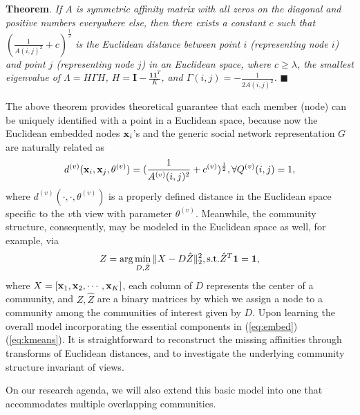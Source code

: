 \vspace{5pt}
\textbf{Theorem}. \textit{If $A$ is symmetric affinity matrix with all zeros on the diagonal and positive numbers everywhere else, then there exists a constant $c$ such that $(\frac{1}{A(i,j)^2}+c)^{\frac{1}{2}}$ is the Euclidean distance between point $i$ (representing node $i$) and point $j$ (representing node $j$) in an Euclidean space, where $c\geq\lambda$, the smallest eigenvalue of $\Lambda=H\Gamma H$, $H=\mathbf{I}-\frac{\mathbf{1}\mathbf{1}^T}{K}$, and $\Gamma(i,j)=-\frac{1}{2A(i,j)^2}$.} $\blacksquare$
\vspace{5pt}


The above theorem provides theoretical guarantee that each member (node) can be uniquely identified with a point in a Euclidean space, because now the Euclidean embedded nodes ${\bf x}_i$'s and the generic social network representation $G$ are naturally related as
\begin{equation}\label{eq:embed}
d^{(v)}({\bf x}_i, {\bf x}_j, \theta^{(v)})=(\frac{1}{A^{(v)}(i,j)^2}+c^{(v)})^{\frac{1}{2}}, \forall Q^{(v)}(i,j)=1,
\end{equation}
where $d^{(v)}(\cdot, \cdot, \theta^{(v)})$ is a properly defined distance in the Euclidean space specific to the $v$th view with parameter $\theta^{(v)}$. Meanwhile, the community structure, consequently, may be modeled in the Euclidean space as well, for example, via
\begin{equation}\label{eq:kmeans}
Z=\arg\min_{D,\hat{Z}}\|X-D\hat{Z}\|^{2}_{2}, \textup{s.t.} \hat{Z}^{T}\mathbf{1}=\mathbf{1},
 \end{equation}
where $X=[{\bf x}_1,{\bf x}_2,\cdots,{\bf x}_K]$, each column of $D$ represents the center of a community, and $Z, \hat{Z}$ are a binary matrices by which we assign a node to a community among the communities of interest given by $D$. Upon learning the overall model incorporating the essential components in (\ref{eq:embed})(\ref{eq:kmeans}). It is straightforward to reconstruct the missing affinities through transforms of Euclidean distances, and to investigate the underlying community structure invariant of views.

On our research agenda, we will also extend this basic model into one that accommodates multiple overlapping communities.